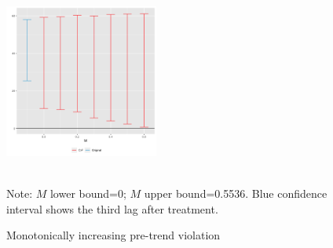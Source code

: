 \documentclass{beamer}
\begin{document}
\begin{frame}[label=sensitivity_positive, noframenumbering]
 
\begin{figure}[h]  
\centering
\caption{Monotonically increasing pre-trend violation}%

\begin{center} 
\end{center} 
\includegraphics[width=0.45\textwidth]{Figures_pres/pretrends_sensitivity_increasing.png}

       \\   
{\footnotesize Note: $M$ lower bound=0; $M$ upper bound=0.5536. Blue confidence interval shows the third lag after treatment.} 
 \\  
  \hyperlink{robustness}{} 
\end{figure} 
      
\end{frame}
\end{document}
